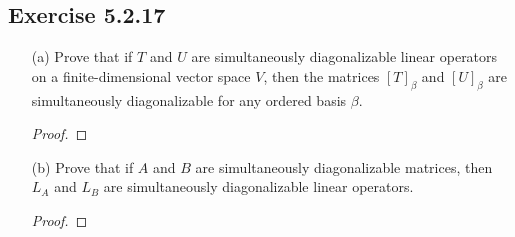 \subsection*{Exercise 5.2.17} 
\begin{enumerate}
    \item[(a)] Prove that if \( T  \) and \( U  \) are simultaneously diagonalizable linear operators on a finite-dimensional vector space \( V  \), then the matrices \( [T]_{\beta} \) and \( [U]_{\beta} \) are simultaneously diagonalizable for any ordered basis \( \beta \).
        \begin{proof}
        
        \end{proof}
    \item[(b)] Prove that if \( A  \) and \( B  \) are simultaneously diagonalizable matrices, then \( {L}_{A} \) and \( {L}_{B} \) are simultaneously diagonalizable linear operators.
        \begin{proof}
        
        \end{proof}
\end{enumerate}
